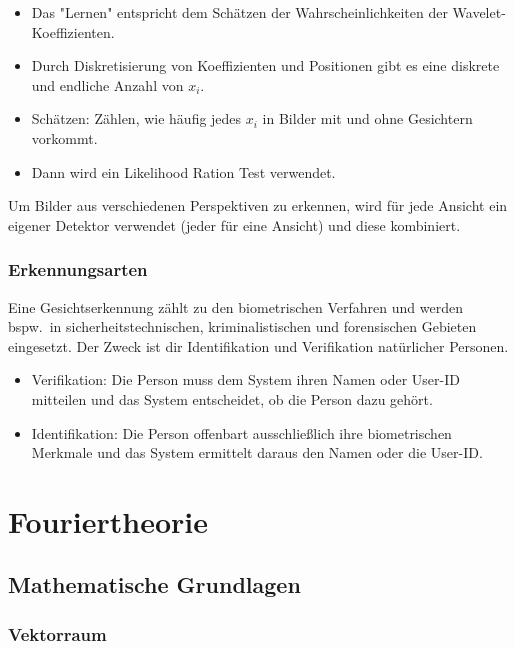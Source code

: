 \documentclass[a4paper, 11pt, accentcolor = tud3b]{tudreport}
\newcommand{\bspw}{bspw.~}
\begin{document}
\begin{enumerate}
\begin{itemize}
\begin{itemize}
								\end{itemize}
							\item Das "Lernen" entspricht dem Schätzen der Wahrscheinlichkeiten der Wavelet-Koeffizienten.
							\item Durch Diskretisierung von Koeffizienten und Positionen gibt es eine diskrete und endliche Anzahl von \(x_i\).
							\item Schätzen: Zählen, wie häufig jedes \(x_i\) in Bilder mit und ohne Gesichtern vorkommt.
							\item Dann wird ein Likelihood Ration Test verwendet.
						\end{itemize}
				\end{enumerate}
			
				Um Bilder aus verschiedenen Perspektiven zu erkennen, wird für jede Ansicht ein eigener Detektor verwendet (jeder für eine Ansicht) und diese kombiniert.

			\subsection{Erkennungsarten}
				Eine Gesichtserkennung zählt zu den biometrischen Verfahren und werden \bspw in sicherheitstechnischen, kriminalistischen und forensischen Gebieten eingesetzt. Der Zweck ist dir Identifikation und Verifikation natürlicher Personen.
				\begin{itemize}
					\item Verifikation: Die Person muss dem System ihren Namen oder User-ID mitteilen und das System entscheidet, ob die Person dazu gehört.
					\item Identifikation: Die Person offenbart ausschließlich ihre biometrischen Merkmale und das System ermittelt daraus den Namen oder die User-ID.
				\end{itemize}

	\chapter{Fouriertheorie} %

		\section{Mathematische Grundlagen} %

			\subsection{Vektorraum} %
\end{document}
